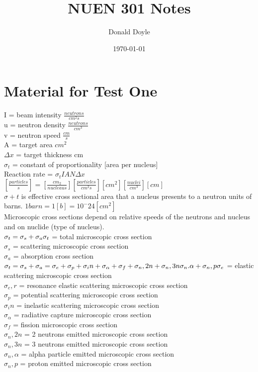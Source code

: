 \documentclass[12pt,fleqn, parskip=full]{scrartcl}
\title{NUEN 301 Notes}
\author{Donald Doyle }
\date{\today}
\begin{document}
\maketitle

\section{Material for Test One}

I = beam intensity $\frac{neutrons}{cm^2 s}$\\
u = neutron density $\frac{neutrons}{cm^3}$\\
v = neutron speed $\frac{cm}{s}$\\
A = target area $cm^2$\\
$\Delta x$ = target thickness cm\\
$\sigma_t$ = constant of proportionality [area per nucleus]\\
Reaction rate = $\sigma_t IAN \Delta x $\\
$ [\frac{particles}{s}] = [\frac{cm_2}{nucleaus}][\frac{particles}{cm^2 s}][cm^2][\frac{nuclei}{cm^3}][cm]$\\
$\sigma+t$ is effective cross sectional area that a nucleus presents to a neutron units of barns. $1 barn = 1 [b] = 10^-24 [cm^2]$\\

Microscopic cross sections depend on relative speeds of the neutrons and nucleus and on nuclide (type of nucleus).\\
$\sigma_t = \sigma_s + \sigma_a\\
\sigma_t$ = total microscopic cross section \\
$\sigma_s$ = scattering microscopic cross section \\
$\sigma_a$ = absorption cross section  \\

$\sigma_t = \sigma_s + \sigma_a = \sigma_e + \sigma_p + \sigma_in + \sigma_\alpha + \sigma_f + \sigma_n,2n + \sigma_n,3n \sigma_n.\alpha + \sigma_n,p \\
\sigma_e$ = elastic scattering microscopic cross section \\
$\sigma_e,r$ = resonance elastic scattering microscopic cross section \\
$\sigma_p$ = potential scattering microscopic cross section \\
$\sigma_in$ = inelastic scattering microscopic cross section \\
$\sigma_\alpha$ = radiative capture microscopic cross section \\
$\sigma_f$ = fission microscopic cross section \\
$\sigma_n,2n$ = 2 neutrons emitted microscopic cross section \\
$\sigma_n,3n$ = 3 neutrons emitted microscopic cross section \\
$\sigma_n,\alpha$ = alpha particle emitted microscopic cross section \\
$\sigma_n,p$ = proton emitted microscopic cross section \\
\end{document}
